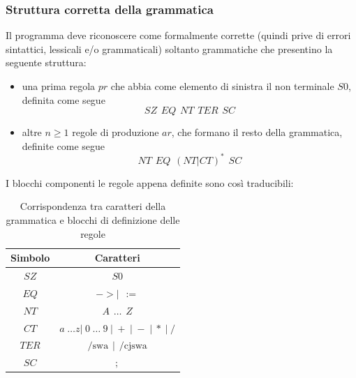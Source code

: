 \documentclass[12pt]{article}
\begin{document}
\subsubsection{Struttura corretta della grammatica}\label{struttura}
Il programma deve riconoscere come formalmente corrette (quindi prive di errori sintattici, lessicali e/o grammaticali) soltanto grammatiche che presentino la seguente struttura:
\begin{itemize}
\item una prima regola $pr$ che abbia come elemento di sinistra il non terminale $S0$, definita come segue
$$
SZ \hspace{5pt} EQ \hspace{5pt} NT \hspace{5pt} TER \hspace{5pt} SC
$$
\item altre $n \geq 1$ regole di produzione $ar$, che formano il resto della grammatica, definite come segue
$$
NT \hspace{5pt} EQ \hspace{5pt} \left( NT \left| CT \right. \right)^* \hspace{5pt} SC
$$
\end{itemize}
I blocchi componenti le regole appena definite sono così traducibili:
\begin{table}[h]
\centering
\begin{tabular}{|c|c|}
\hline
\textbf{Simbolo} & \textbf{Caratteri} \\
\hline
$SZ$ & $S0$ \\
\hline
$EQ$ & $-> \left| \hspace{5pt} := \right.$ \\
\hline
$NT$ & $A \hspace{5pt} \dots \hspace{5pt} Z$ \\
\hline
$CT$ & $a \hspace{3pt} \dots z \left| \hspace{3pt} 0 \hspace{3pt} \dots \hspace{3pt} 9 \hspace{3pt} \right| \hspace{3pt} + \hspace{3pt} \left| \hspace{3pt} - \hspace{3pt} \right| \hspace{3pt} * \hspace{3pt} \left| \hspace{3pt} / \right.$ \\
\hline
$TER$ & $\text{/swa} \hspace{5pt} \left| \hspace{5pt} \text{/cjswa} \right.$ \\
\hline
$SC$ & $;$ \\
\hline
\end{tabular}
\caption{Corrispondenza tra caratteri della grammatica e blocchi di definizione delle regole}
\end{table}
\end{document}
